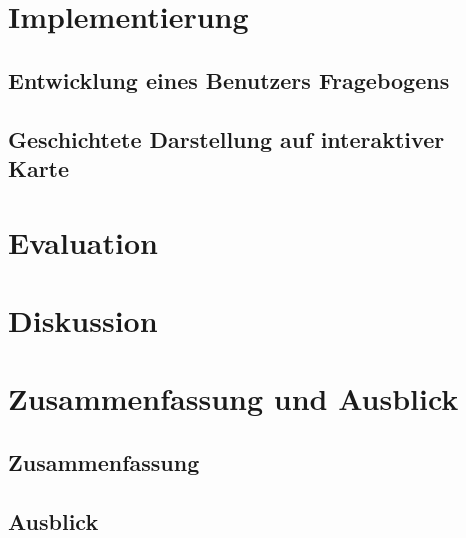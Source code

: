 






\chapter{Implementierung}
\section{Entwicklung eines Benutzers Fragebogens}
\section{Geschichtete Darstellung auf interaktiver Karte}

\chapter{Evaluation}

\chapter{Diskussion}

\chapter{Zusammenfassung und Ausblick}
\section{Zusammenfassung}
\section{Ausblick}
